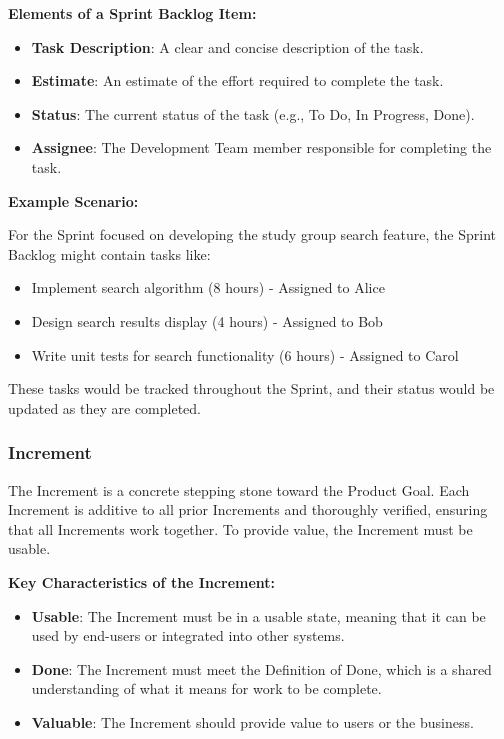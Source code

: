 \textbf{Elements of a Sprint Backlog Item:}

\begin{itemize}
  \item \textbf{Task Description}: A clear and concise description of the task.
  \item \textbf{Estimate}: An estimate of the effort required to complete the task.
  \item \textbf{Status}: The current status of the task (e.g., To Do, In Progress, Done).
  \item \textbf{Assignee}: The Development Team member responsible for completing the task.
\end{itemize}

\textbf{Example Scenario:}

For the Sprint focused on developing the study group search feature, the Sprint
Backlog might contain tasks like:

\begin{itemize}
  \item Implement search algorithm (8 hours) - Assigned to Alice
  \item Design search results display (4 hours) - Assigned to Bob
  \item Write unit tests for search functionality (6 hours) - Assigned to Carol
\end{itemize}

These tasks would be tracked throughout the Sprint, and their status would be
updated as they are completed.

\subsubsection{Increment}

The Increment is a concrete stepping stone toward the Product Goal. Each
Increment is additive to all prior Increments and thoroughly verified, ensuring
that all Increments work together. To provide value, the Increment must be
usable.

\textbf{Key Characteristics of the Increment:}

\begin{itemize}
  \item \textbf{Usable}: The Increment must be in a usable state, meaning that it can be used by end-users or integrated into other systems.
  \item \textbf{Done}: The Increment must meet the Definition of Done, which is a shared understanding of what it means for work to be complete.
  \item \textbf{Valuable}: The Increment should provide value to users or the business.
\end{itemize}

